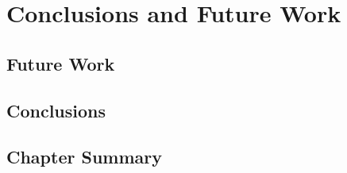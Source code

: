 \chapter{Conclusions and Future Work}
\section{Future Work}
\section{Conclusions}
\section{Chapter Summary}